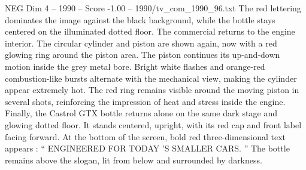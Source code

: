 \begin{textsample}{NEG Dim 4 – 1990 – Score -1.00 – 1990/tv\_com\_1990\_96.txt}
The red lettering dominates the image against the black background, while the bottle stays centered on the illuminated dotted floor.
The commercial returns to the engine interior.
The circular cylinder and piston are shown again, now with a red glowing ring around the piston area.
The piston continues its up-and-down motion inside the grey metal bore.
Bright white flashes and orange-red combustion-like bursts alternate with the mechanical view, making the cylinder appear extremely hot.
The red ring remains visible around the moving piston in several shots, reinforcing the impression of heat and stress inside the engine.
Finally, the Castrol GTX bottle returns alone on the same dark stage and glowing dotted floor.
It stands centered, upright, with its red cap and front label facing forward.
At the bottom of the screen, bold red three-dimensional text appears : “ ENGINEERED FOR TODAY ’S SMALLER CARS. ” The bottle remains above the slogan, lit from below and surrounded by darkness.

\end{textsample}
